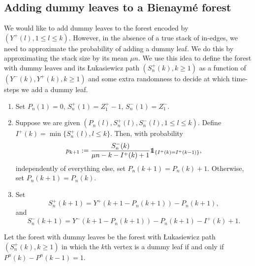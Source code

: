 \subsection{Adding dummy leaves to a Bienaymé forest}\label{subsec.purpleleavesGWforest}
We would like to add dummy leaves to the forest encoded by $(Y^+(l),1\leq l \leq k)$. However, in the absence of a true stack of in-edges, we need to approximate the probability of adding a dummy leaf. We do this by approximating the stack size by its mean $\mu n$. 
We use this idea to define the forest with dummy leaves and its \L ukasiewicz path $(S_n^{+}(k), k\geq 1)$ as a function of $(Y^-(k), Y^+(k) ,k\geq 1)$ and some extra randomness to decide at which time-steps we add a dummy leaf.
\begin{enumerate} 
    \item Set $P_n(1)=0$, $S_n^{+}(1)=Z_1^+-1$, $S_n^{-}(1)=Z_1^-$. 
    \item Suppose we are given $(P_n(l),S_n^{+}(l),S_n^{-}(l), 1\leq l \leq k)$. Define 
    $I^{+}(k)=\min\{S_n^{+}(l), l\leq k\}$. Then, with probability $$p_{k+1}:=\frac{S_n^{-}(k)}{\mu n - k -I^{+}(k)+1}\one_{\{I^{+}(k)=I^{+}(k-1)\}},$$ independently of everything else, set $P_n(k+1)=P_n(k)+1$. Otherwise, set $P_n(k+1)=P_n(k)$. 
    \item Set $$S_n^{+}(k+1)=Y^+(k+1-P_n(k+1))-P_n(k+1),$$ and $$S_n^{-}(k+1)=Y^-(k+1-P_n(k+1))-P_n(k+1)-I^{+}(k)+1.$$
\end{enumerate}
Let the forest with dummy leaves be the forest with \L ukasiewicz path $(S_n^{+}(k), k\geq 1)$ in which the $k$th vertex is a dummy leaf if and only if $P^n(k)-P^n(k-1)=1$. 
